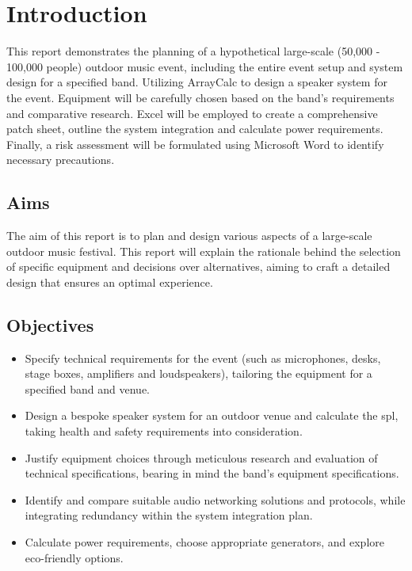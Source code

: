 \section{Introduction}
    This report demonstrates the planning of a hypothetical large-scale (50,000 - 100,000 people) outdoor music event, including the entire event setup and system design for a specified band. Utilizing ArrayCalc to design a speaker system for the event. Equipment will be carefully chosen based on the band's requirements and comparative research. Excel will be employed to create a comprehensive patch sheet, outline the system integration and calculate power requirements. Finally, a risk assessment will be formulated using Microsoft Word to identify necessary precautions.

    \subsection{Aims}
    The aim of this report is to plan and design various aspects of a large-scale outdoor music festival. This report will explain the rationale behind the selection of specific equipment and decisions over alternatives, aiming to craft a detailed design that ensures an optimal experience.
    
    \subsection{Objectives}
        \begin{itemize}
            \item Specify technical requirements for the event (such as microphones, desks, stage boxes, amplifiers and loudspeakers), tailoring the equipment for a specified band and venue.
            \item Design a bespoke speaker system for an outdoor venue and calculate the \gls{spl}, taking health and safety requirements into consideration.
            \item Justify equipment choices through meticulous research and evaluation of technical specifications, bearing in mind the band's equipment specifications.
            \item Identify and compare suitable audio networking solutions and protocols, while integrating redundancy within the system integration plan.
            \item Calculate power requirements, choose appropriate generators, and explore eco-friendly options.
        \end{itemize}